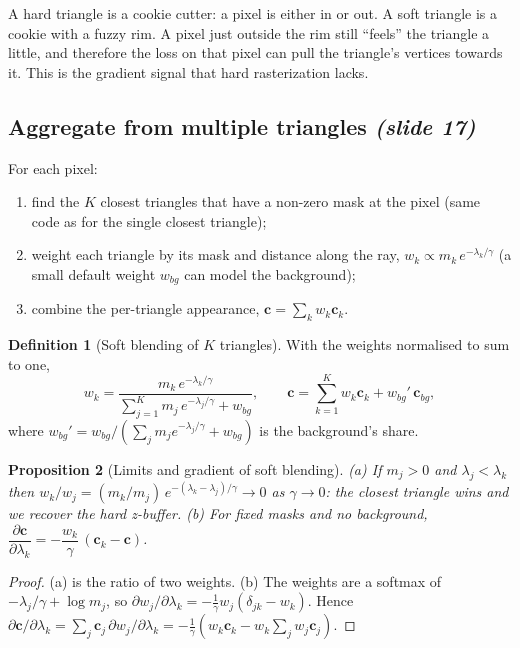 \documentclass[11pt,a4paper]{article}
\newcommand{\sr}[1]{\texorpdfstring{\emph{(#1)}}{(#1)}}
\theoremstyle{definition}
\newtheorem{definition}{Definition}[section]
\theoremstyle{algstyle}
\theoremstyle{plain}
\newtheorem{proposition}[definition]{Proposition}
\theoremstyle{remark}
\begin{document}
\begin{intuition}
A hard triangle is a cookie cutter: a pixel is either in or out. A soft triangle is a cookie with a fuzzy rim. A pixel just outside the rim still ``feels'' the triangle a little, and therefore the loss on that pixel can pull the triangle's vertices towards it. This is the gradient signal that hard rasterization lacks.
\end{intuition}

\subsection{Aggregate from multiple triangles \sr{slide 17}}
For each pixel:
\begin{enumerate}[nosep]
\item find the $K$ closest triangles that have a non-zero mask at the pixel (same code as for the single closest triangle);
\item weight each triangle by its mask and distance along the ray, $w_k\propto m_k\,e^{-\lambda_k/\gamma}$ (a small default weight $w_{bg}$ can model the background);
\item combine the per-triangle appearance, $\bm c=\sum_k w_k\bm c_k$.
\end{enumerate}

\begin{definition}[Soft blending of $K$ triangles]
With the weights normalised to sum to one,
\[
w_k=\frac{m_k\,e^{-\lambda_k/\gamma}}{\sum_{j=1}^{K}m_j\,e^{-\lambda_j/\gamma}+w_{bg}},\qquad
\bm c=\sum_{k=1}^{K}w_k\bm c_k+w_{bg}'\,\bm c_{bg},
\]
where $w_{bg}'=w_{bg}/(\sum_j m_je^{-\lambda_j/\gamma}+w_{bg})$ is the background's share.
\end{definition}

\begin{proposition}[Limits and gradient of soft blending]\label{prop:softblend}
(a) If $m_j>0$ and $\lambda_j<\lambda_k$ then $w_k/w_j=(m_k/m_j)\,e^{-(\lambda_k-\lambda_j)/\gamma}\to0$ as $\gamma\to0$: the closest triangle wins and we recover the hard z-buffer. (b) For fixed masks and no background, $\dfrac{\partial\bm c}{\partial\lambda_k}=-\dfrac{w_k}{\gamma}\,(\bm c_k-\bm c)$.
\end{proposition}
\begin{proof}
(a) is the ratio of two weights. (b) The weights are a softmax of $-\lambda_j/\gamma+\log m_j$, so $\partial w_j/\partial\lambda_k=-\tfrac1\gamma w_j(\delta_{jk}-w_k)$. Hence $\partial\bm c/\partial\lambda_k=\sum_j\bm c_j\,\partial w_j/\partial\lambda_k=-\tfrac1\gamma(w_k\bm c_k-w_k\sum_jw_j\bm c_j)$.
\end{proof}
\end{document}

